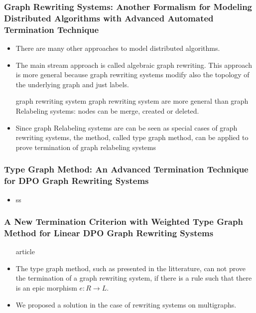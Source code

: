 \subsubsection*{Graph Rewriting Systems: Another Formalism for Modeling Distributed Algorithms with Advanced Automated Termination Technique}
\begin{itemize} 
    \item There are many other approaches to model distributed algorithms.
    \item The main stream approach is called algebraic graph rewriting. This approach is more general because graph rewriting systems modify also the topology of the underlying graph and just labels. 
    \item[graph rewriting system] graph rewriting system are more general than graph Relabeling systems: nodes can be merge, created or deleted.
    \item Since graph Relabeling systems are can be seen as special cases of graph rewriting systems, the method, called type graph method, can be applied to prove termination of graph relabeling systems
\end{itemize}



\subsubsection*{Type Graph Method: An Advanced Termination Technique for DPO Graph Rewriting Systems}

\begin{itemize}
    \item ss
\end{itemize}

\subsubsection*{A New Termination Criterion with Weighted Type Graph Method for Linear DPO Graph Rewriting Systems}
\begin{itemize}
    \item[article]
    \item The type graph method, such as presented in the litterature, can not prove the termination of a graph rewriting system, if there is a rule such that there is an epic morphism $e: R \to L$.
    \item We proposed a solution in the case of rewriting systems on multigraphs.
\end{itemize}

